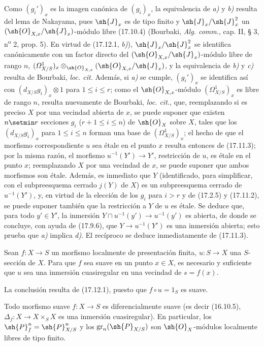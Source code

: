 Como $(g_i')_x$ es la imagen canónica de $(g_i)_x$, la equivalencia de \emph{a)} y \emph{b)} resulta del lema de Nakayama, pues $\sh{J}_x$ es de tipo finito y $\sh{J}_x/\sh{J}_x^2$ un $(\sh{O}_{X,x}/\sh{J}_x)$-módulo libre (17.10.4) (Bourbaki, \emph{Alg. comm.}, cap. II, § 3, n\textsuperscript{o} 2, prop. 5). En virtud de (17.12.1, \emph{b)}), $\sh{J}_x/\sh{J}_x^2$ se identifica canónicamente con un factor directo del $(\sh{O}_{X,x}/\sh{J}_x)$-módulo libre de rango $n$, $(\varOmega^1_{X/S})_x\otimes_{\sh{O}_{X,x}}(\sh{O}_{X,x}/\sh{J}_x)$, y la equivalencia de \emph{b)} y \emph{c)} resulta de Bourbaki, \emph{loc. cit.} Además, si \emph{a)} se cumple, $(g_i')_x$ se identifica así con $(d_{X/S}g_i)_x\otimes1$ para $1\leq i\leq r$; como el $\sh{O}_{X,x}$-módulo $(\varOmega^1_{X/S})_x$ es libre de rango $n$, resulta nuevamente de Bourbaki, \emph{loc. cit.}, que, reemplazando si es preciso $X$ por una vecindad abierta de $x$, se puede suponer que existen $n\setmin r$ secciones $g_i$ ($r+1\leq i\leq n$) de $\sh{O}_X$ sobre $X$, tales que los $(d_{X/S}g_i)_x$ para $1\leq i\leq n$ forman una base de $(\varOmega^1_{X/S})_x$; el hecho de que el morfismo correspondiente $u$ sea étale en el punto $x$ resulta entonces de (17.11.3); por la misma razón, el morfismo $u^{-1}(Y')\to Y'$, restricción de $u$, es étale en el punto $x$; reemplazando $X$ por una vecindad de $x$, se puede suponer que ambos morfismos son étale. Además, es inmediato que $Y$ (identificado, para simplificar, con el subpreesquema cerrado $j(Y)$ de $X$) es un subpreesquema cerrado de $u^{-1}(Y')$, y, en virtud de la elección de los $g_i$ para $i>r$ y de (17.2.5) y (17.11.2), se puede suponer también que la restricción a $Y$ de $u$ es étale. Se deduce que, para todo $y'\in Y'$, la inmersión $Y\cap u^{-1}(y')\to u^{-1}(y')$ es abierta, de donde se concluye, con ayuda de (17.9.6), que $Y\to u^{-1}(Y')$ es una inmersión abierta; esto prueba que \emph{a)} implica \emph{d)}. El recíproco se deduce inmediatamente de (17.11.3).

\begin{corollary}[17.12.3]
\label{IV.17.12.3}
Sean $f:X\to S$ un morfismo localmente de presentación finita, $u:S\to X$ una $S$-sección de $X$. Para que $f$ sea suave en un punto $x\in X$, es necesario y suficiente que $u$ sea una inmersión cuasiregular en una vecindad de $s=f(x)$.
\end{corollary}

La conclusión resulta de (17.12.1), puesto que $f\circ u=1_S$ es suave.

\begin{proposition}[17.12.4]
\label{IV.17.12.4}
Todo morfismo suave $f:X\to S$ es diferencialmente suave \textup{(es decir (16.10.5), $\Delta_f:X\to X\times_SX$ es una inmersión cuasiregular)}. En particular, los $\sh{P}_f^n=\sh{P}_{X/S}^n$ y los $\operatorname{gr}_n(\sh{P}_{X/S})$ son $\sh{O}_X$-módulos localmente libres de tipo finito.
\end{proposition}

